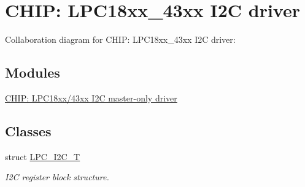 \hypertarget{group___i2_c__18_x_x__43_x_x}{}\section{C\+H\+IP\+: L\+P\+C18xx\+\_\+43xx I2C driver}
\label{group___i2_c__18_x_x__43_x_x}
Collaboration diagram for C\+H\+IP\+: L\+P\+C18xx\+\_\+43xx I2C driver\+:
\subsection*{Modules}
\begin{DoxyCompactItemize}
\item 
\hyperlink{group___i2_c_m__18_x_x__43_x_x}{C\+H\+I\+P\+: L\+P\+C18xx/43xx I2\+C master-\/only driver}
\end{DoxyCompactItemize}
\subsection*{Classes}
\begin{DoxyCompactItemize}
\item 
struct \hyperlink{struct_l_p_c___i2_c___t}{L\+P\+C\+\_\+\+I2\+C\+\_\+T}
\begin{DoxyCompactList}\small\item\em I2C register block structure. \end{DoxyCompactList}\end{DoxyCompactItemize}
